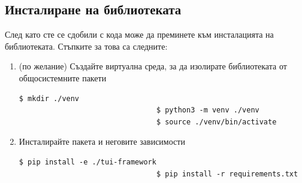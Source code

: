         \subsection{Инсталиране на библиотеката}

        След като сте се сдобили с кода може да преминете към инсталацията на 
        библиотеката. Стъпките за това са следните:

        \begin{enumerate}

                \item (по желание) Създайте виртуална среда, за да изолирате
                        библиотеката от общосистемните пакети 
                        \begin{lstlisting}[style=shell]
                                $ mkdir ./venv
                                $ python3 -m venv ./venv
                                $ source ./venv/bin/activate
                        \end{lstlisting}

                \item Инсталирайте пакета и неговите зависимости
                        \begin{lstlisting}[style=shell]
                                $ pip install -e ./tui-framework
                                $ pip install -r requirements.txt
                        \end{lstlisting}




        \end{enumerate}

